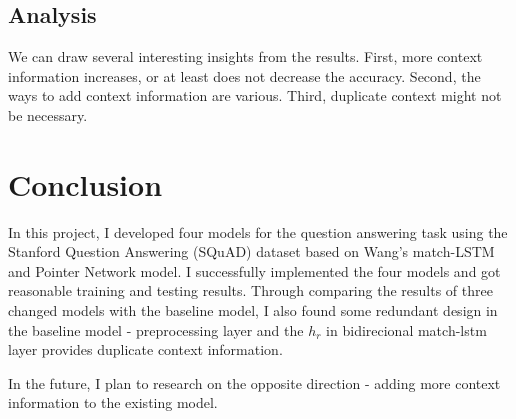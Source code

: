 \documentclass[modernstyle,12pt]{sjsuthesis}
\theoremstyle{definition}
\begin{document}
\section{Analysis}
We can draw several interesting insights from the results. First, more context information increases, or at least does not decrease the accuracy. Second, the ways to add context information are various. Third, duplicate context might not be necessary.





\chapter{Conclusion}

In this project, I developed four models for the question answering task using the Stanford Question Answering (SQuAD) dataset based on Wang's match-LSTM and Pointer Network model. I successfully implemented the four models and got reasonable training and testing results. Through comparing the results of three changed models with the baseline model, I also found some redundant design in the baseline model - preprocessing layer and the $h_r$ in bidirecional match-lstm layer provides duplicate context information.

In the future, I plan to research on the opposite direction - adding more context information to the existing model.



%
%
%











\end{document}
